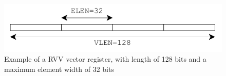 \begin{figure}
    \centering
    \includegraphics{Figures/RVV_Simple_Widths.pdf}
    \caption{Example of a RVV vector register, with length of 128 bits and a maximum element width of 32 bits}
    \label{fig:RVV_simple_widths}
\end{figure}